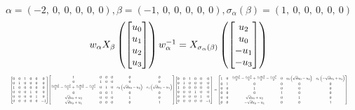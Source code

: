 \documentclass[11pt]{article}
\theoremstyle{definition}
\begin{document}
\[
\alpha = \left( -2, \  0, \  0, \  0, \  0, \  0\right), \beta = \left( -1, \  0, \  0, \  0, \  0, \  0\right), \sigma_{\alpha}(\beta) = \left( 1, \  0, \  0, \  0, \  0, \  0\right)
\]
\[
\scaletoalign{\textwidth}{w_{\alpha} X_{\beta}\left(\left[\begin{matrix}u_{0}\\u_{1}\\u_{2}\\u_{3}\end{matrix}\right]\right) w_{\alpha}^{-1} = X_{\sigma_{\alpha}\left(\beta\right)}\left(\left[\begin{matrix}u_{2}\\u_{0}\\- u_{1}\\- u_{3}\end{matrix}\right]\right)}
\]
\[
\scaletoalign{\textwidth}{{\left[\begin{matrix}0 & 0 & 1 & 0 & 0 & 0\\0 & 1 & 0 & 0 & 0 & 0\\1 & 0 & 0 & 0 & 0 & 0\\0 & 0 & 0 & 1 & 0 & 0\\0 & 0 & 0 & 0 & 1 & 0\\0 & 0 & 0 & 0 & 0 & -1\end{matrix}\right]} {\left[\begin{matrix}1 & 0 & 0 & 0 & 0 & 0\\0 & 1 & 0 & 0 & 0 & 0\\\frac{c_{0} d u_{0}^{2}}{2} - \frac{c_{0} u_{2}^{2}}{2} + \frac{c_{1} d u_{3}^{2}}{2} - \frac{c_{1} u_{1}^{2}}{2} & 0 & 1 & 0 & c_{0} \left(\sqrt{d} u_{0} - u_{2}\right) & c_{1} \left(\sqrt{d} u_{3} - u_{1}\right)\\0 & 0 & 0 & 1 & 0 & 0\\\sqrt{d} u_{0} + u_{2} & 0 & 0 & 0 & 1 & 0\\\sqrt{d} u_{3} + u_{1} & 0 & 0 & 0 & 0 & 1\end{matrix}\right]} {\left[\begin{matrix}0 & 0 & 1 & 0 & 0 & 0\\0 & 1 & 0 & 0 & 0 & 0\\1 & 0 & 0 & 0 & 0 & 0\\0 & 0 & 0 & 1 & 0 & 0\\0 & 0 & 0 & 0 & 1 & 0\\0 & 0 & 0 & 0 & 0 & -1\end{matrix}\right]} = {\left[\begin{matrix}1 & 0 & \frac{c_{0} d u_{0}^{2}}{2} - \frac{c_{0} u_{2}^{2}}{2} + \frac{c_{1} d u_{3}^{2}}{2} - \frac{c_{1} u_{1}^{2}}{2} & 0 & c_{0} \left(\sqrt{d} u_{0} - u_{2}\right) & c_{1} \left(- \sqrt{d} u_{3} + u_{1}\right)\\0 & 1 & 0 & 0 & 0 & 0\\0 & 0 & 1 & 0 & 0 & 0\\0 & 0 & 0 & 1 & 0 & 0\\0 & 0 & \sqrt{d} u_{0} + u_{2} & 0 & 1 & 0\\0 & 0 & - \sqrt{d} u_{3} - u_{1} & 0 & 0 & 1\end{matrix}\right]}}
\]
\end{document}
